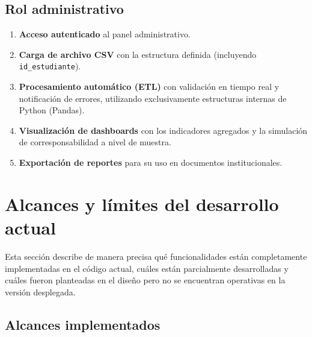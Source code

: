 \documentclass[12pt, spanish]{article}
\begin{document}
\subsection{Rol administrativo}
\begin{enumerate}
    \item \textbf{Acceso autenticado} al panel administrativo.
    \item \textbf{Carga de archivo CSV} con la estructura definida (incluyendo \texttt{id\_estudiante}).
    \item \textbf{Procesamiento automático (ETL)} con validación en tiempo real y notificación de errores, utilizando exclusivamente estructuras internas de Python (Pandas).
    \item \textbf{Visualización de dashboards} con los indicadores agregados y la simulación de corresponsabilidad a nivel de muestra.
    \item \textbf{Exportación de reportes} para su uso en documentos institucionales.
\end{enumerate}

\section{Alcances y límites del desarrollo actual}

Esta sección describe de manera precisa qué funcionalidades están completamente implementadas en el código actual, cuáles están parcialmente desarrolladas y cuáles fueron planteadas en el diseño pero no se encuentran operativas en la versión desplegada.

\subsection{Alcances implementados}
\end{document}
